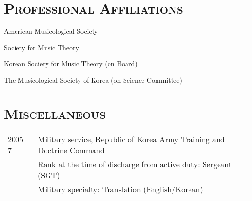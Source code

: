 \documentclass[a4paper,11pt]{article}
\begin{document}
  \vspace{5.0mm}
  
  \section*{\textsc{Professional Affiliations}}
  
  American Musicological Society
  
  \noindent Society for Music Theory
  
  \noindent Korean Society for Music Theory (on Board)
  
  \noindent The Musicological Society of Korea (on Science Committee)
  
  \section*{\textsc{Miscellaneous}}
  
  \hspace*{-0.25cm}
  \begin{tabular}{p{2.5cm} l}
    2005–7 & Military service, Republic of Korea Army Training and Doctrine Command\\
    & Rank at the time of discharge from active duty: Sergeant (SGT)\\
    & Military specialty: Translation (English/Korean)
  \end{tabular}
\end{document}
